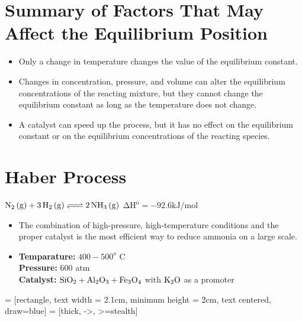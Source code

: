 \documentclass[a4paper,12pt,twocolumn]{article}
\begin{document}
\section{Summary of Factors That May Affect the Equilibrium Position}
\begin{itemize}
    \item Only a change in temperature changes the value of the equilibrium constant. 
    \item Changes in concentration, pressure, and volume can alter the equilibrium concentrations of the reacting mixture, but they cannot change the equilibrium constant as long as the temperature does not change.
    \item A catalyst can speed up the process, but it has no effect on the equilibrium constant or on the equilibrium concentrations of the reacting species.
\end{itemize}

\section{Haber Process}
\begin{center}
    $\ce{N2 (g) + 3H2 (g) <=> 2NH3 (g)}$ $\mathrm{\Delta H^{o} = -92.6 kJ/mol}$
\end{center}
\begin{itemize}
    \item The combination of high-pressure, high-temperature conditions and the proper catalyst is the most efficient way to reduce ammonia on a large scale.
    \item  \textbf{Temparature:} $400-500^o$ C \\
          \textbf{Pressure:} 600 atm \\
          \textbf{Catalyst:}  $\ce{SiO2 + Al2O3 + Fe3O4}$ with $\ce{K2O}$ as a promoter
\end{itemize}


 = [rectangle, text width = 2.1cm,
minimum height = 2cm, text centered, draw=blue]
 = [thick, ->, >=stealth]
\end{document}
